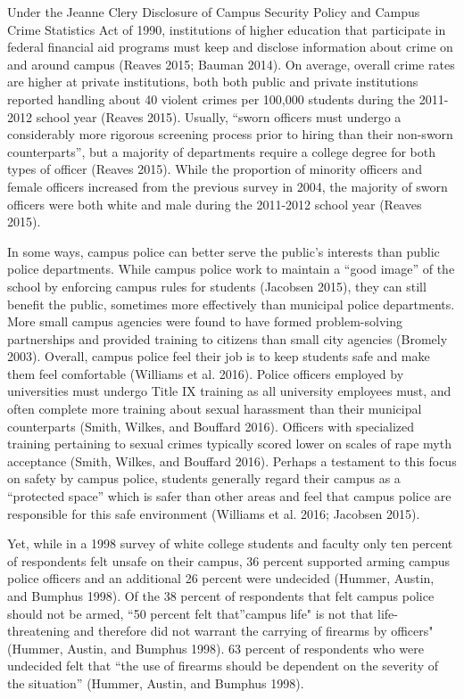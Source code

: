 \documentclass{ucetd}
\begin{document}
Under the Jeanne Clery Disclosure of Campus Security Policy and Campus
Crime Statistics Act of 1990, institutions of higher education that
participate in federal financial aid programs must keep and disclose
information about crime on and around campus (Reaves 2015; Bauman 2014).
On average, overall crime rates are higher at private institutions, both
both public and private institutions reported handling about 40 violent
crimes per 100,000 students during the 2011-2012 school year (Reaves
2015). Usually, ``sworn officers must undergo a considerably more
rigorous screening process prior to hiring than their non-sworn
counterparts'', but a majority of departments require a college degree
for both types of officer (Reaves 2015). While the proportion of
minority officers and female officers increased from the previous survey
in 2004, the majority of sworn officers were both white and male during
the 2011-2012 school year (Reaves 2015).

In some ways, campus police can better serve the public's interests than
public police departments. While campus police work to maintain a ``good
image'' of the school by enforcing campus rules for students (Jacobsen
2015), they can still benefit the public, sometimes more effectively
than municipal police departments. More small campus agencies were found
to have formed problem-solving partnerships and provided training to
citizens than small city agencies (Bromely 2003). Overall, campus police
feel their job is to keep students safe and make them feel comfortable
(Williams et al. 2016). Police officers employed by universities must
undergo Title IX training as all university employees must, and often
complete more training about sexual harassment than their municipal
counterparts (Smith, Wilkes, and Bouffard 2016). Officers with
specialized training pertaining to sexual crimes typically scored lower
on scales of rape myth acceptance (Smith, Wilkes, and Bouffard 2016).
Perhaps a testament to this focus on safety by campus police, students
generally regard their campus as a ``protected space'' which is safer
than other areas and feel that campus police are responsible for this
safe environment (Williams et al. 2016; Jacobsen 2015).

Yet, while in a 1998 survey of white college students and faculty only
ten percent of respondents felt unsafe on their campus, 36 percent
supported arming campus police officers and an additional 26 percent
were undecided (Hummer, Austin, and Bumphus 1998). Of the 38 percent of
respondents that felt campus police should not be armed, ``50 percent
felt that''campus life" is not that life-threatening and therefore did
not warrant the carrying of firearms by officers" (Hummer, Austin, and
Bumphus 1998). 63 percent of respondents who were undecided felt that
``the use of firearms should be dependent on the severity of the
situation'' (Hummer, Austin, and Bumphus 1998).
\end{document}
